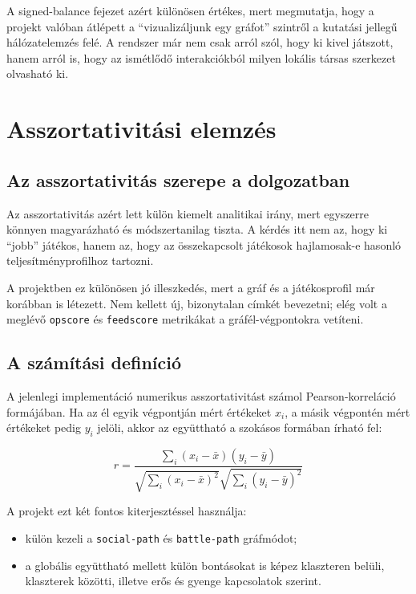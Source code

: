 \documentclass[a4paper,12pt]{report}
\begin{document}
A signed-balance fejezet azért különösen értékes, mert megmutatja, hogy a projekt valóban átlépett a ``vizualizáljunk egy gráfot'' szintről a kutatási jellegű hálózatelemzés felé. A rendszer már nem csak arról szól, hogy ki kivel játszott, hanem arról is, hogy az ismétlődő interakciókból milyen lokális társas szerkezet olvasható ki.

\chapter{Asszortativitási elemzés}

\section{Az asszortativitás szerepe a dolgozatban}

Az asszortativitás azért lett külön kiemelt analitikai irány, mert egyszerre könnyen magyarázható és módszertanilag tiszta. A kérdés itt nem az, hogy ki ``jobb'' játékos, hanem az, hogy az összekapcsolt játékosok hajlamosak-e hasonló teljesítményprofilhoz tartozni.

A projektben ez különösen jó illeszkedés, mert a gráf és a játékosprofil már korábban is létezett. Nem kellett új, bizonytalan címkét bevezetni; elég volt a meglévő \texttt{opscore} és \texttt{feedscore} metrikákat a gráfél-végpontokra vetíteni.

\section{A számítási definíció}

A jelenlegi implementáció numerikus asszortativitást számol Pearson-korreláció formájában. Ha az él egyik végpontján mért értékeket $x_i$, a másik végpontén mért értékeket pedig $y_i$ jelöli, akkor az együttható a szokásos formában írható fel:

\begin{equation}
r = \frac{\sum_i (x_i-\bar{x})(y_i-\bar{y})}{\sqrt{\sum_i (x_i-\bar{x})^2}\sqrt{\sum_i (y_i-\bar{y})^2}}
\end{equation}

A projekt ezt két fontos kiterjesztéssel használja:

\begin{itemize}
    \item külön kezeli a \texttt{social-path} és \texttt{battle-path} gráfmódot;
    \item a globális együttható mellett külön bontásokat is képez klaszteren belüli, klaszterek közötti, illetve erős és gyenge kapcsolatok szerint.
\end{itemize}
\end{document}
